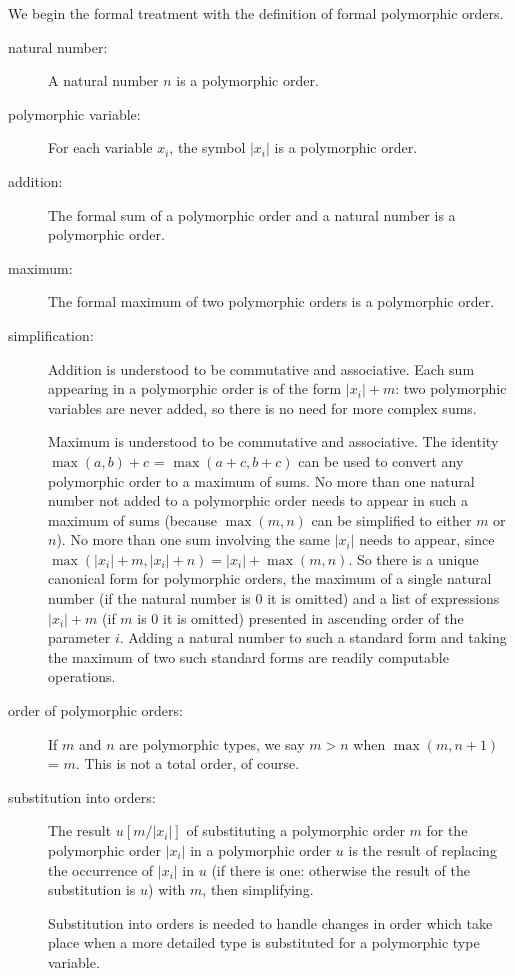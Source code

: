 \documentclass{article}
\begin{document}
We begin the formal treatment with the definition of formal
polymorphic orders.

\begin{description}

\item[natural number:]  A natural number $n$ is a polymorphic order.

\item[polymorphic variable:] For each variable $x_i$, the symbol
$|x_i|$ is a polymorphic order.

\item[addition:] The formal sum of a polymorphic order and a natural number
is a polymorphic order.

\item[maximum:] The formal maximum of two polymorphic orders is a
polymorphic order.

\item[simplification:] Addition is understood to be commutative and
associative.  Each sum appearing in a polymorphic order is of the form
$|x_i|+m$:  two polymorphic variables are never added, so there is no
need for more complex sums.

Maximum is understood to be commutative and associative.  The identity
$\max(a,b)+c$ = $\max(a+c,b+c)$ can be used to convert any polymorphic
order to a maximum of sums.  No more than one natural number not added
to a polymorphic order needs to appear in such a maximum of sums (because
$\max(m,n)$ can be simplified to either $m$ or $n$).  No more than one
sum involving the same $|x_i|$ needs to appear, since
$\max(|x_i|+m,|x_i|+n) = |x_i| + \max(m,n)$.  So there is a unique
canonical form for polymorphic orders, the maximum of a single natural
number (if the natural number is 0 it is omitted) and a list of
expressions $|x_i|+m$ (if $m$ is 0 it is omitted) presented in
ascending order of the parameter $i$.  Adding a natural number to such
a standard form and taking the maximum of two such standard forms are
readily computable operations.

\item[order of polymorphic orders:] If $m$ and $n$ are polymorphic
types, we say $m>n$ when $\max(m,n+1)$ = $m$.  This is not a total
order, of course.

\item[substitution into orders:] The result $u[m/|x_i|]$ of
substituting a polymorphic order $m$ for the polymorphic order $|x_i|$
in a polymorphic order $u$ is the result of replacing the occurrence
of $|x_i|$ in $u$ (if there is one: otherwise the result of the
substitution is $u$) with $m$, then simplifying.

Substitution into orders is needed to handle changes in order which
take place when a more detailed type is substituted for a polymorphic
type variable.

\end{description}
\end{document}
